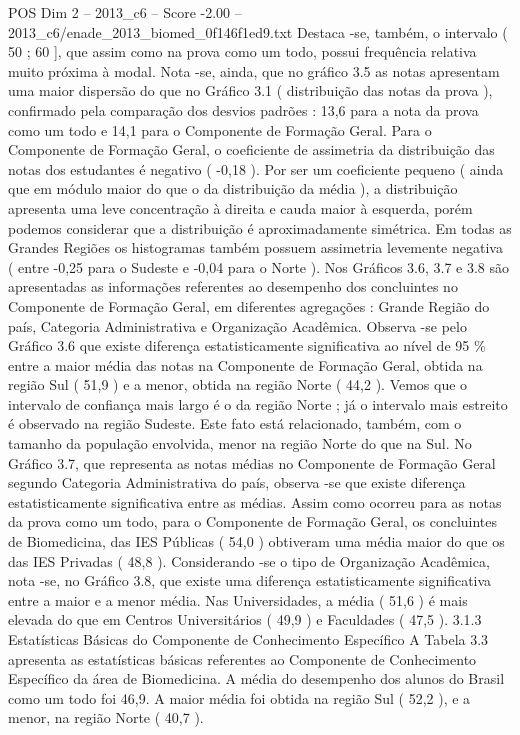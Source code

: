 \begin{textsample}{POS Dim 2 – 2013\_c6 – Score -2.00 – 2013\_c6/enade\_2013\_biomed\_0f146f1ed9.txt}
Destaca -se, também, o intervalo ( 50 ; 60 ], que assim como na prova como um todo, possui frequência relativa muito próxima à modal.
Nota -se, ainda, que no gráfico 3.5 as notas apresentam uma maior dispersão do que no Gráfico 3.1 ( distribuição das notas da prova ), confirmado pela comparação dos desvios padrões : 13,6 para a nota da prova como um todo e 14,1 para o Componente de Formação Geral.
Para o Componente de Formação Geral, o coeficiente de assimetria da distribuição das notas dos estudantes é negativo ( -0,18 ).
Por ser um coeficiente pequeno ( ainda que em módulo maior do que o da distribuição da média ), a distribuição apresenta uma leve concentração à direita e cauda maior à esquerda, porém podemos considerar que a distribuição é aproximadamente simétrica.
Em todas as Grandes Regiões os histogramas também possuem assimetria levemente negativa ( entre -0,25 para o Sudeste e -0,04 para o Norte ).
Nos Gráficos 3.6, 3.7 e 3.8 são apresentadas as informações referentes ao desempenho dos concluintes no Componente de Formação Geral, em diferentes agregações : Grande Região do país, Categoria Administrativa e Organização Acadêmica.
Observa -se pelo Gráfico 3.6 que existe diferença estatisticamente significativa ao nível de 95 \% entre a maior média das notas na Componente de Formação Geral, obtida na região Sul ( 51,9 ) e a menor, obtida na região Norte ( 44,2 ).
Vemos que o intervalo de confiança mais largo é o da região Norte ; já o intervalo mais estreito é observado na região Sudeste.
Este fato está relacionado, também, com o tamanho da população envolvida, menor na região Norte do que na Sul.
No Gráfico 3.7, que representa as notas médias no Componente de Formação Geral segundo Categoria Administrativa do país, observa -se que existe diferença estatisticamente significativa entre as médias.
Assim como ocorreu para as notas da prova como um todo, para o Componente de Formação Geral, os concluintes de Biomedicina, das IES Públicas ( 54,0 ) obtiveram uma média maior do que os das IES Privadas ( 48,8 ).
Considerando -se o tipo de Organização Acadêmica, nota -se, no Gráfico 3.8, que existe uma diferença estatisticamente significativa entre a maior e a menor média.
Nas Universidades, a média ( 51,6 ) é mais elevada do que em Centros Universitários ( 49,9 ) e Faculdades ( 47,5 ). 3.1.3 Estatísticas Básicas do Componente de Conhecimento Específico A Tabela 3.3 apresenta as estatísticas básicas referentes ao Componente de Conhecimento Específico da área de Biomedicina.
A média do desempenho dos alunos do Brasil como um todo foi 46,9.
A maior média foi obtida na região Sul ( 52,2 ), e a menor, na região Norte ( 40,7 ).

\end{textsample}
